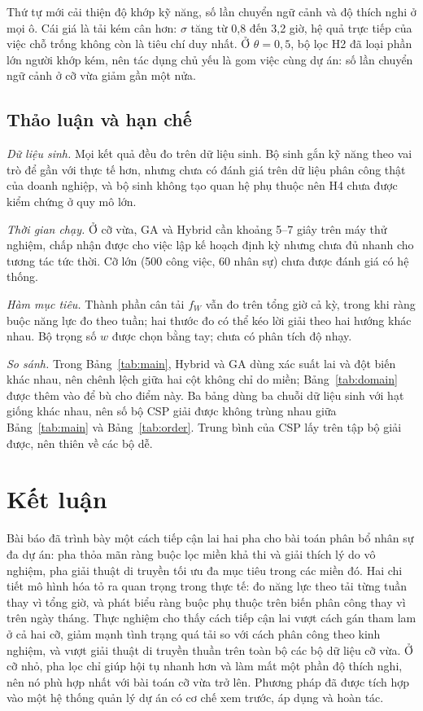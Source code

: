 \documentclass{IEEEtran}
\begin{document}
Thứ tự mới cải thiện độ khớp kỹ năng, số lần chuyển ngữ cảnh và độ thích nghi ở mọi ô. Cái giá là tải kém cân hơn: $\sigma$ tăng từ 0,8 đến 3,2 giờ, hệ quả trực tiếp của việc chỗ trống không còn là tiêu chí duy nhất. Ở $\theta=0{,}5$, bộ lọc H2 đã loại phần lớn người khớp kém, nên tác dụng chủ yếu là gom việc cùng dự án: số lần chuyển ngữ cảnh ở cỡ vừa giảm gần một nửa.

\subsection{Thảo luận và hạn chế}

\textit{Dữ liệu sinh.} Mọi kết quả đều đo trên dữ liệu sinh. Bộ sinh gắn kỹ năng theo vai trò để gần với thực tế hơn, nhưng chưa có đánh giá trên dữ liệu phân công thật của doanh nghiệp, và bộ sinh không tạo quan hệ phụ thuộc nên H4 chưa được kiểm chứng ở quy mô lớn.

\textit{Thời gian chạy.} Ở cỡ vừa, GA và Hybrid cần khoảng 5--7 giây trên máy thử nghiệm, chấp nhận được cho việc lập kế hoạch định kỳ nhưng chưa đủ nhanh cho tương tác tức thời. Cỡ lớn (500 công việc, 60 nhân sự) chưa được đánh giá có hệ thống.

\textit{Hàm mục tiêu.} Thành phần cân tải $f_W$ vẫn đo trên tổng giờ cả kỳ, trong khi ràng buộc năng lực đo theo tuần; hai thước đo có thể kéo lời giải theo hai hướng khác nhau. Bộ trọng số $w$ được chọn bằng tay; chưa có phân tích độ nhạy.

\textit{So sánh.} Trong Bảng~\ref{tab:main}, Hybrid và GA dùng xác suất lai và đột biến khác nhau, nên chênh lệch giữa hai cột không chỉ do miền; Bảng~\ref{tab:domain} được thêm vào để bù cho điểm này. Ba bảng dùng ba chuỗi dữ liệu sinh với hạt giống khác nhau, nên số bộ CSP giải được không trùng nhau giữa Bảng~\ref{tab:main} và Bảng~\ref{tab:order}. Trung bình của CSP lấy trên tập bộ giải được, nên thiên về các bộ dễ.

\section{Kết luận}
\label{sec:conclusion}

Bài báo đã trình bày một cách tiếp cận lai hai pha cho bài toán phân bổ nhân sự đa dự án: pha thỏa mãn ràng buộc lọc miền khả thi và giải thích lý do vô nghiệm, pha giải thuật di truyền tối ưu đa mục tiêu trong các miền đó. Hai chi tiết mô hình hóa tỏ ra quan trọng trong thực tế: đo năng lực theo tải từng tuần thay vì tổng giờ, và phát biểu ràng buộc phụ thuộc trên biến phân công thay vì trên ngày tháng. Thực nghiệm cho thấy cách tiếp cận lai vượt cách gán tham lam ở cả hai cỡ, giảm mạnh tình trạng quá tải so với cách phân công theo kinh nghiệm, và vượt giải thuật di truyền thuần trên toàn bộ các bộ dữ liệu cỡ vừa. Ở cỡ nhỏ, pha lọc chỉ giúp hội tụ nhanh hơn và làm mất một phần độ thích nghi, nên nó phù hợp nhất với bài toán cỡ vừa trở lên. Phương pháp đã được tích hợp vào một hệ thống quản lý dự án có cơ chế xem trước, áp dụng và hoàn tác.
\end{document}

